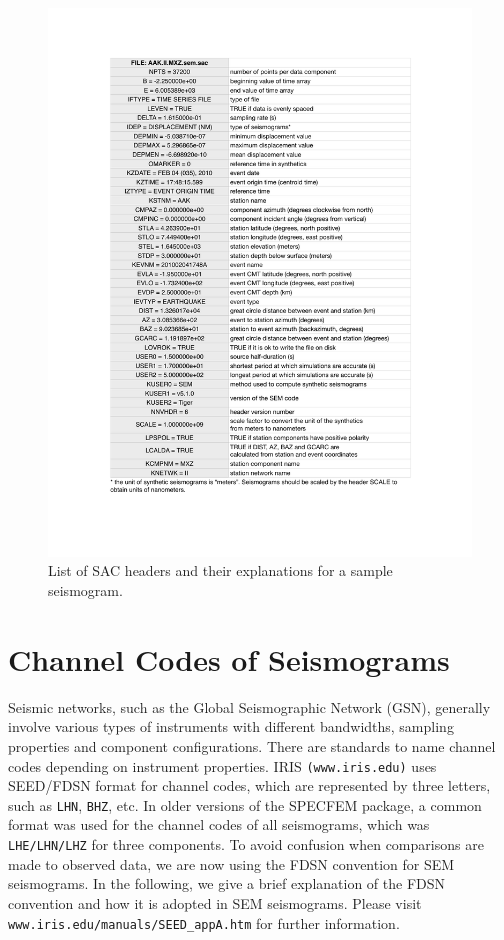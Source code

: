 \documentclass[oneside,english]{book}
\begin{document}
\begin{figure}[ht]
\noindent \begin{centering}
\includegraphics[scale=0.8]{figures/headers_sem_explained.pdf}\caption{\label{fig:SAC-headers}List of SAC headers and their explanations for a sample seismogram.}

\par\end{centering}
\end{figure}

\chapter{\label{cha:channel-codes}Channel Codes of Seismograms}

Seismic networks, such as the Global Seismographic Network (GSN), generally involve various types of instruments with different bandwidths, sampling properties and component configurations. There are standards to name channel codes depending on instrument properties. IRIS  \texttt{(www.iris.edu)} uses SEED/FDSN format for channel codes, which are represented by three letters, such as \texttt{LHN}, \texttt{BHZ}, etc. In older versions of the SPECFEM package, a common format was used for the channel codes of all seismograms, which was \texttt{LHE/LHN/LHZ} for three components. To avoid confusion when comparisons are made to observed data, we are now using the FDSN convention for SEM seismograms. In the following, we give a brief explanation of the FDSN convention and how it is adopted in SEM seismograms. Please visit \texttt{www.iris.edu/manuals/SEED\_appA.htm} for further information.\\
\end{document}
